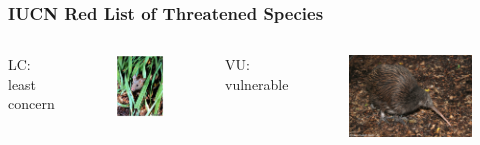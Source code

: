 \begin{frame}
        \frametitle{IUCN Red List of Threatened Species}

        \begin{columns}
                LC: least concern
                \begin{figure}
                        \includegraphics[height=0.2\textheight]{Pics/LC}
                \end{figure}
                VU: vulnerable
                \begin{figure}
                        \includegraphics[height=0.2\textheight]{Pics/VU}

\end{figure}
\end{columns}
\end{frame}
